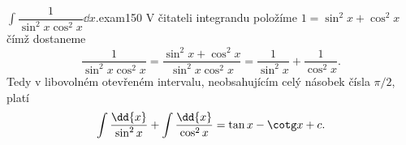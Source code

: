 \begin{mathexam}{\(\int\dfrac{1}{\sin^2x\cos^2x}\dd{x}.\)}{exam150} 
  V čitateli integrandu položíme \(1=\sin^2x +\cos^2x\) čímž dostaneme
  \[\dfrac{1}{\sin^2x\cos^2x} = \dfrac{\sin^2x +\cos^2x}{\sin^2x\cos^2x} 
                              = \dfrac{1}{\sin^2x} + \dfrac{1}{\cos^2x}.\]
  Tedy v libovolném otevřeném intervalu, neobsahujícím celý násobek čísla \(\pi/2\), platí
  \begin{equation*}
    \int\dfrac{\dd{x}}{\sin^2x} + \int\dfrac{\dd{x}}{\cos^2x} = \tan x - \cotg x + c.
  \end{equation*}
  \vspace{-3mm}
\end{mathexam}